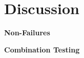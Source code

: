 \section{Discussion}\label{sec: Discussion}
\noindent \textbf{Non-\mccs Failures}

\noindent \textbf{Combination Testing}